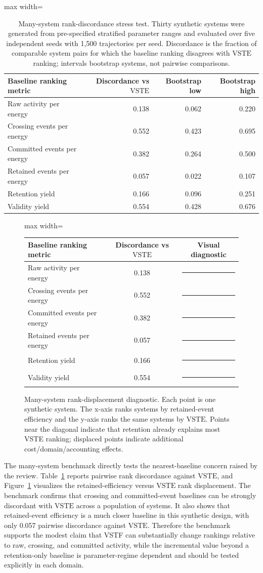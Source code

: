\documentclass[11pt,a4paper]{article}
\newcommand{\VSTE}{\ensuremath{\mathrm{VSTE}}}
\newcommand{\1}{\mathbf{1}}
\newcommand{\VSTFBar}[2]{\textcolor{#1}{\rule{#2}{0.75em}}}
\newcommand{\VSTFRankFigure}{%
  \begin{adjustbox}{max width=\linewidth}
  \begin{tabular}{lcc}
  \toprule
  Baseline ranking metric & Discordance vs \VSTE{} & Visual diagnostic\\
  \midrule
  Raw activity per energy & 0.138 & \VSTFBar{orange!75!black}{1.2em}\\
  Crossing events per energy & 0.552 & \VSTFBar{red!70!black}{4.8em}\\
  Committed events per energy & 0.382 & \VSTFBar{red!55!black}{3.3em}\\
  Retained events per energy & 0.057 & \VSTFBar{green!55!black}{0.5em}\\
  Retention yield & 0.166 & \VSTFBar{orange!75!black}{1.4em}\\
  Validity yield & 0.554 & \VSTFBar{red!70!black}{4.8em}\\
  \bottomrule
  \end{tabular}
  \end{adjustbox}
}
\begin{document}
\begin{table}[h]
\centering
\caption{Many-system rank-discordance stress test. Thirty synthetic systems were generated from pre-specified stratified parameter ranges and evaluated over five independent seeds with 1,500 trajectories per seed. Discordance is the fraction of comparable system pairs for which the baseline ranking disagrees with \VSTE{} ranking; intervals bootstrap systems, not pairwise comparisons.}
\label{tab:many-system-discordance}
\small
\begin{adjustbox}{max width=\linewidth}
\begin{tabular}{lrrr}
\toprule
Baseline ranking metric & Discordance vs \VSTE{} & Bootstrap low & Bootstrap high \\
\midrule
Raw activity per energy & 0.138 & 0.062 & 0.220 \\
Crossing events per energy & 0.552 & 0.423 & 0.695 \\
Committed events per energy & 0.382 & 0.264 & 0.500 \\
Retained events per energy & 0.057 & 0.022 & 0.107 \\
Retention yield & 0.166 & 0.096 & 0.251 \\
Validity yield & 0.554 & 0.428 & 0.676 \\
\bottomrule
\end{tabular}
\end{adjustbox}
\end{table}

\begin{figure}[h]
\centering
\VSTFRankFigure
\caption{Many-system rank-displacement diagnostic. Each point is one synthetic system. The x-axis ranks systems by retained-event efficiency and the y-axis ranks the same systems by \VSTE{}. Points near the diagonal indicate that retention already explains most VSTE ranking; displaced points indicate additional cost/domain/accounting effects.}
\label{fig:many-system-rank}
\end{figure}

The many-system benchmark directly tests the nearest-baseline concern raised by the review. Table~\ref{tab:many-system-discordance} reports pairwise rank discordance against \VSTE{}, and Figure~\ref{fig:many-system-rank} visualizes the retained-efficiency versus \VSTE{} rank displacement. The benchmark confirms that crossing and committed-event baselines can be strongly discordant with \VSTE{} across a population of systems. It also shows that retained-event efficiency is a much closer baseline in this synthetic design, with only 0.057 pairwise discordance against \VSTE{}. Therefore the benchmark supports the modest claim that VSTF can substantially change rankings relative to raw, crossing, and committed activity, while the incremental value beyond a retention-only baseline is parameter-regime dependent and should be tested explicitly in each domain.
\end{document}
